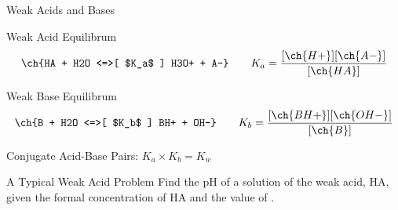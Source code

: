 \documentclass[11pt,letterpaper]{article}
\begin{document}
\begin{frame}{Weak Acids and Bases}
	\begin{block}{Weak Acid Equilibrum}
		\begin{align*}
			\ch{HA + H2O <=>[ $K_a$ ] H3O+ + A-} \qquad K_a =
			\dfrac{[\ch{H+}][\ch{A-}]}{[\ch{HA}]}
		\end{align*}
	\end{block}

	\begin{block}{Weak Base Equilibrum}
		\begin{align*}
			\ch{B + H2O <=>[ $K_b$ ] BH+ + OH-} \qquad K_b =
			\dfrac{[\ch{BH+}][\ch{OH-}]}{[\ch{B}]}
		\end{align*}
	\end{block}

	Conjugate Acid-Base Pairs: $K_a \times K_b = K_w$
\end{frame}

\begin{frame}[t]{A Typical Weak Acid Problem}
	Find the pH of a solution of the weak acid, HA, given the formal
	concentration of HA and the value of \Ka.


\end{frame}
\end{document}
